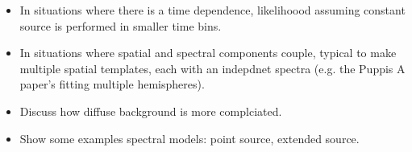 \begin{itemize}
\item In situations where there is a time dependence, likelihoood assuming constant
  source is performed in smaller time bins.
\item In situations where spatial and spectral components couple, typical to make
  multiple spatial templates, each with an indepdnet spectra (e.g. the Puppis A paper's
  fitting multiple hemispheres).
\item Discuss how diffuse background is more complciated.
\item Show some examples spectral models: point source, extended source.
\end{itemize}
